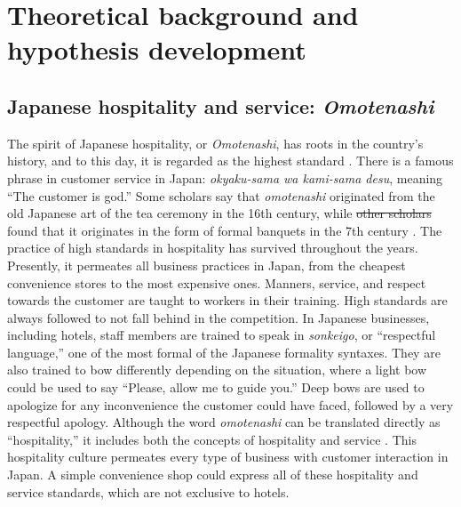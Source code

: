\documentclass[smallextended,natbib]{svjour3}       %
\providecommand{\DIFadd}[1]{{\protect\color{blue}\uwave{#1}}} %
\providecommand{\DIFdel}[1]{{\protect\color{red}\sout{#1}}}                      %
\providecommand{\DIFaddbegin}{} %
\providecommand{\DIFaddend}{} %
\providecommand{\DIFdelbegin}{} %
\providecommand{\DIFdelend}{} %
\newcommand{\DIFscaledelfig}{0.5}
\newlength{\DIFdelgraphicswidth} %
\newlength{\DIFdelgraphicsheight} %
\newcommand{\DIFaddincludegraphics}[2][]{{\color{blue}\fbox{\DIFOincludegraphics[#1]{#2}}}} %
\newcommand{\DIFdelincludegraphics}[2][]{%
\sbox{\DIFdelgraphicsbox}{\DIFOincludegraphics[#1]{#2}}%
\settoboxwidth{\DIFdelgraphicswidth}{\DIFdelgraphicsbox} %
\settoboxtotalheight{\DIFdelgraphicsheight}{\DIFdelgraphicsbox} %
\scalebox{\DIFscaledelfig}{%
\parbox[b]{\DIFdelgraphicswidth}{\usebox{\DIFdelgraphicsbox}\\[-\baselineskip] \rule{\DIFdelgraphicswidth}{0em}}\llap{\resizebox{\DIFdelgraphicswidth}{\DIFdelgraphicsheight}{%
\setlength{\unitlength}{\DIFdelgraphicswidth}%
\begin{picture}(1,1)%
\thicklines\linethickness{2pt} %
{\color[rgb]{1,0,0}\put(0,0){\framebox(1,1){}}}%
{\color[rgb]{1,0,0}\put(0,0){\line( 1,1){1}}}%
{\color[rgb]{1,0,0}\put(0,1){\line(1,-1){1}}}%
\end{picture}%
}\hspace*{3pt}}} %
} %
\DeclareRobustCommand{\DIFaddbegin}{\DIFOaddbegin \let\includegraphics\DIFaddincludegraphics} %
\DeclareRobustCommand{\DIFaddend}{\DIFOaddend \let\includegraphics\DIFOincludegraphics} %
\DeclareRobustCommand{\DIFdelbegin}{\DIFOdelbegin \let\includegraphics\DIFdelincludegraphics} %
\DeclareRobustCommand{\DIFdelend}{\DIFOaddend \let\includegraphics\DIFOincludegraphics} %
\begin{document}
\DIFdelend \section{Theoretical background and hypothesis development}\label{theory_hypothesis}

  \subsection{Japanese hospitality and service: \textit{Omotenashi}}\label{theory_omotenashi}

    The spirit of Japanese hospitality, or \textit{Omotenashi}, has roots in the country’s history, and to this day, it is regarded as the highest standard \cite[][]{ikeda2013omotenashi, al2015characteristics}. There is a famous phrase in customer service in Japan: \textit{okyaku-sama wa kami-sama desu}, meaning ``The customer is god.'' Some scholars say that \textit{omotenashi} originated from the old Japanese art of the tea ceremony in the 16th century, while \DIFdelbegin \DIFdel{other scholars }\DIFdelend \DIFaddbegin \DIFadd{others }\DIFaddend found that it originates in the form of formal banquets in the 7th century \cite[][]{aishima2015origin}. The practice of high standards in hospitality has survived throughout the years. Presently, it permeates all business practices in Japan, from the cheapest convenience stores to the most expensive ones. Manners, service, and respect towards the customer are taught to workers in their training. High standards are always followed to not fall behind in the competition. In Japanese businesses, including hotels, staff members are trained to speak in \textit{sonkeigo}, or ``respectful language,'' one of the most formal of the Japanese formality syntaxes. They are also trained to bow differently depending on the situation, where a light bow could be used to say ``Please, allow me to guide you.'' Deep bows are used to apologize for any inconvenience the customer could have faced, followed by a very respectful apology. Although the word \textit{omotenashi} can be translated directly as ``hospitality,'' it includes both the concepts of hospitality and service \cite[][]{Kuboyama2020}. This hospitality culture permeates every type of business with customer interaction in Japan. A simple convenience shop could express all of these hospitality and service standards, which are not exclusive to hotels.  
\end{document}
